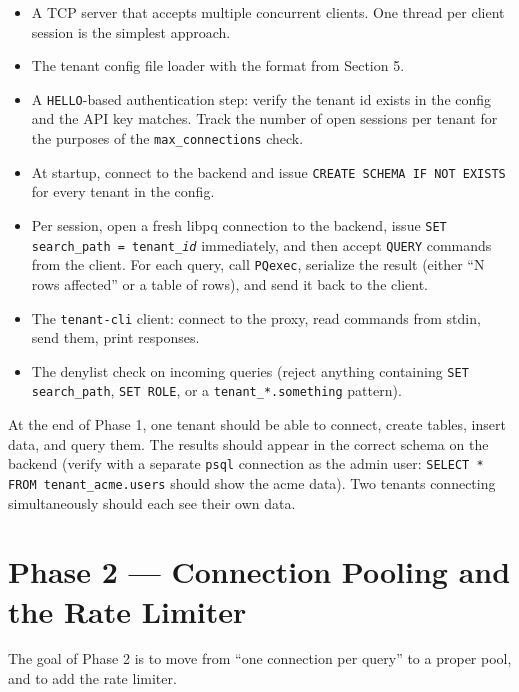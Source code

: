 \documentclass[11pt,a4paper]{article}
\begin{document}
\begin{itemize}
\item A TCP server that accepts multiple concurrent clients. One thread per client session is the simplest approach.

\item The tenant config file loader with the format from Section 5.

\item A \texttt{HELLO}-based authentication step: verify the tenant id exists in the config and the API key matches. Track the number of open sessions per tenant for the purposes of the \texttt{max\_connections} check.

\item At startup, connect to the backend and issue \texttt{CREATE SCHEMA IF NOT EXISTS} for every tenant in the config.

\item Per session, open a fresh libpq connection to the backend, issue \texttt{SET search\_path = tenant\_\textit{id}} immediately, and then accept \texttt{QUERY} commands from the client. For each query, call \texttt{PQexec}, serialize the result (either ``N rows affected'' or a table of rows), and send it back to the client.

\item The \texttt{tenant-cli} client: connect to the proxy, read commands from stdin, send them, print responses.

\item The denylist check on incoming queries (reject anything containing \texttt{SET search\_path}, \texttt{SET ROLE}, or a \texttt{tenant\_*.something} pattern).
\end{itemize}

At the end of Phase 1, one tenant should be able to connect, create tables, insert data, and query them. The results should appear in the correct schema on the backend (verify with a separate \texttt{psql} connection as the admin user: \texttt{SELECT * FROM tenant\_acme.users} should show the acme data). Two tenants connecting simultaneously should each see their own data.

\section{Phase 2 --- Connection Pooling and the Rate Limiter}

The goal of Phase 2 is to move from ``one connection per query'' to a proper pool, and to add the rate limiter.
\end{document}
